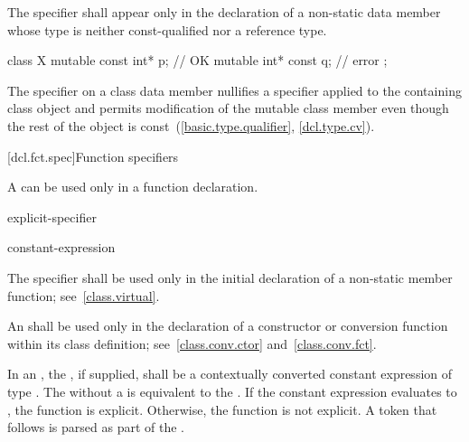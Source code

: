 \pnum
The  specifier shall appear only in the declaration of
a non-static data member
whose type is neither const-qualified nor a reference type.
\begin{example}
\begin{codeblock}
class X {
  mutable const int* p;         // OK
  mutable int* const q;         // error
};
\end{codeblock}
\end{example}

\pnum
\begin{note}
The  specifier on a class data member nullifies a
 specifier applied to the containing class object and
permits modification of the mutable class member even though the rest of
the object is const~(\ref{basic.type.qualifier}, \ref{dcl.type.cv}).
\end{note}

[dcl.fct.spec]{Function specifiers}%
%

\pnum
A
can be used only in a function declaration.

\begin{bnf}
\br
    \br
    explicit-specifier
\end{bnf}

\begin{bnf}
\br
     \terminal{(} constant-expression \terminal{)}\br
\end{bnf}

\pnum
{}%
The  specifier shall be used only in the initial
declaration of a non-static member function; see~\ref{class.virtual}.

\pnum
{}%
An  shall be used only in the declaration of
a constructor or conversion function within its class definition;
see~\ref{class.conv.ctor} and~\ref{class.conv.fct}.

\pnum
In an ,
the , if supplied, shall be a
contextually converted constant expression of type .
The  
without a  is equivalent to
the  .
If the constant expression evaluates to ,
the function is explicit. Otherwise, the function is not explicit.
A \tcode{(} token that follows  is parsed as
part of the .

